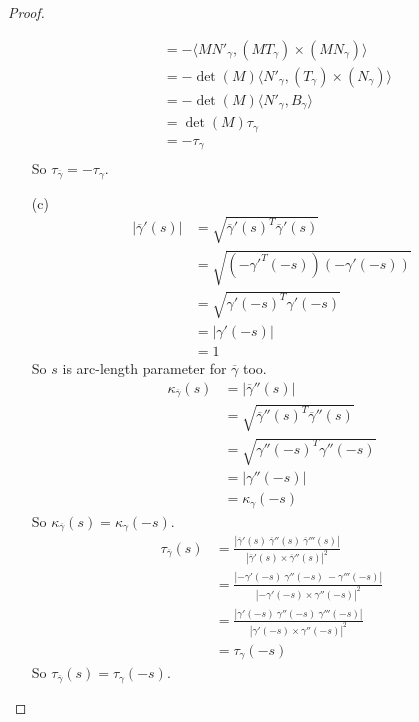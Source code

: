\documentclass[10pt,a4paper]{article}
\begin{document}
\begin{proof}
\begin{enumerate}
\begin{align*}
&=-\langle MN'_{\gamma},\left(MT_{\gamma}\right)\times \left(MN_{\gamma}\right)\rangle\\
&=-\det(M)\langle N'_{\gamma},\left(T_{\gamma}\right)\times \left(N_{\gamma}\right)\rangle\\
&=-\det(M)\langle N'_{\gamma},B_{\gamma}\rangle\\
&=\det(M)\tau_{\gamma}\\
&=-\tau_{\gamma}\\
\end{align*}
So $\tau_{\overline{\gamma}}=-\tau_{\gamma}$.
\item[(c)]
\begin{align*}
\left|\overline{\gamma}'(s)\right|&=\sqrt{\overline{\gamma}'(s)^T\overline{\gamma}'(s)}\\
&=\sqrt{\left(-\gamma'^T(-s)\right)\left(-\gamma'(-s)\right)}\\
&=\sqrt{\gamma'(-s)^T\gamma'(-s)}\\
&=\left|\gamma'(-s)\right|\\
&=1
\end{align*}
So $s$ is arc-length parameter for $\overline{\gamma}$ too.\\
\begin{align*}
\kappa_{\overline{\gamma}}(s)&=\left|\overline{\gamma}''(s)\right|\\
&=\sqrt{\overline{\gamma}''(s)^T\overline{\gamma}''(s)}\\
&=\sqrt{\gamma''(-s)^T\gamma''(-s)}\\
&=\left|\gamma''(-s)\right|\\
&=\kappa_{\gamma}(-s)
\end{align*}
So $\kappa_{\overline{\gamma}}(s)=\kappa_{\gamma}(-s)$.
\begin{align*}
\tau_{\overline{\gamma}}(s)&=\frac{\left|\overline{\gamma}'(s)\ \overline{\gamma}''(s)\ \overline{\gamma}'''(s)\right|}{\left|\overline{\gamma}'(s)\times\overline{\gamma}''(s)\right|^2}\\
&=\frac{\left|-\gamma'(-s)\ \gamma''(-s)\ -\gamma'''(-s)\right|}{\left|-\gamma'(-s)\times\gamma''(-s)\right|^2}\\
&=\frac{\left|\gamma'(-s)\ \gamma''(-s)\ \gamma'''(-s)\right|}{\left|\gamma'(-s)\times\gamma''(-s)\right|^2}\\
&=\tau_{\gamma}(-s)
\end{align*}
So $\tau_{\overline{\gamma}}(s)=\tau_{\gamma}(-s)$.
\end{enumerate}
\end{proof}
\end{document}
